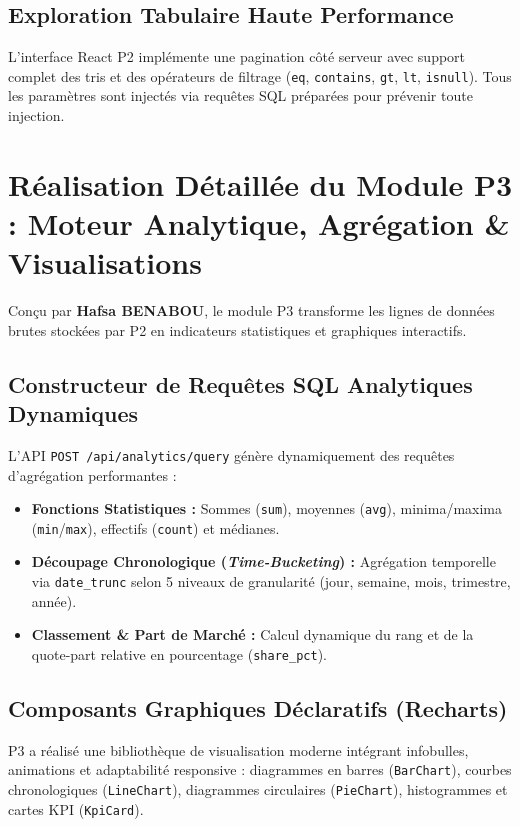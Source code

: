 \documentclass[11pt,a4paper]{article}
\begin{document}
\subsection{Exploration Tabulaire Haute Performance}
L'interface React P2 implémente une pagination côté serveur avec support complet des tris et des opérateurs de filtrage (\texttt{eq}, \texttt{contains}, \texttt{gt}, \texttt{lt}, \texttt{isnull}). Tous les paramètres sont injectés via requêtes SQL préparées pour prévenir toute injection.

\section{Réalisation Détaillée du Module P3 : Moteur Analytique, Agrégation \& Visualisations}

Conçu par \textbf{Hafsa BENABOU}, le module P3 transforme les lignes de données brutes stockées par P2 en indicateurs statistiques et graphiques interactifs.

\subsection{Constructeur de Requêtes SQL Analytiques Dynamiques}
L'API \texttt{POST /api/analytics/query} génère dynamiquement des requêtes d'agrégation performantes :
\begin{itemize}[leftmargin=1.5cm, label=\textcolor{techblue}{\textbullet}]
    \item \textbf{Fonctions Statistiques :} Sommes (\texttt{sum}), moyennes (\texttt{avg}), minima/maxima (\texttt{min}/\texttt{max}), effectifs (\texttt{count}) et médianes.
    \item \textbf{Découpage Chronologique (\textit{Time-Bucketing}) :} Agrégation temporelle via \texttt{date\_trunc} selon 5 niveaux de granularité (jour, semaine, mois, trimestre, année).
    \item \textbf{Classement \& Part de Marché :} Calcul dynamique du rang et de la quote-part relative en pourcentage (\texttt{share\_pct}).
\end{itemize}

\subsection{Composants Graphiques Déclaratifs (Recharts)}
P3 a réalisé une bibliothèque de visualisation moderne intégrant infobulles, animations et adaptabilité responsive : diagrammes en barres (\texttt{BarChart}), courbes chronologiques (\texttt{LineChart}), diagrammes circulaires (\texttt{PieChart}), histogrammes et cartes KPI (\texttt{KpiCard}).
\end{document}
